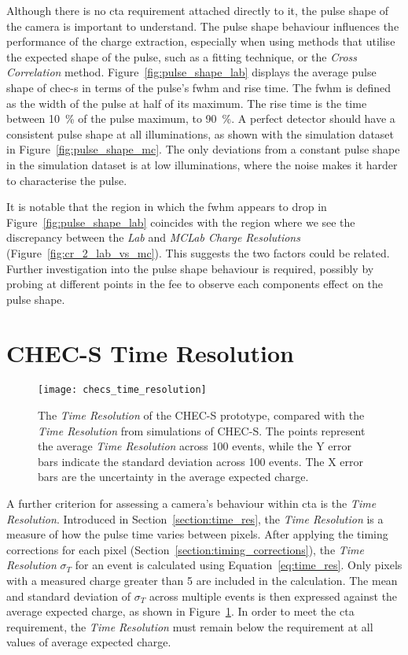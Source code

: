 Although there is no \gls{cta} requirement attached directly to it, the pulse shape of the camera is important to understand. The pulse shape behaviour influences the performance of the charge extraction, especially when using methods that utilise the expected shape of the pulse, such as a fitting technique, or the \textit{Cross Correlation} method. Figure~\ref{fig:pulse_shape_lab} displays the average pulse shape of \gls{chec-s} in terms of the pulse's \gls{fwhm} and rise time. The \gls{fwhm} is defined as the width of the pulse at half of its maximum. The rise time is the time between \SI{10}{\percent} of the pulse maximum, to \SI{90}{\percent}. A perfect detector should have a consistent pulse shape at all illuminations, as shown with the simulation dataset in Figure~\ref{fig:pulse_shape_mc}. The only deviations from a constant pulse shape in the simulation dataset is at low illuminations, where the noise makes it harder to characterise the pulse. 

It is notable that the region in which the \gls{fwhm} appears to drop in Figure~\ref{fig:pulse_shape_lab} coincides with the region where we see the discrepancy between the \textit{Lab} and \textit{MCLab Charge Resolutions} (Figure~\ref{fig:cr_2_lab_vs_mc}). This suggests the two factors could be related. Further investigation into the pulse shape behaviour is required, possibly by probing at different points in the \gls{fee} to observe each components effect on the pulse shape. 

\section{CHEC-S Time Resolution}

\begin{figure}
	\centering
    \texttt{[image: checs\_time\_resolution]} 
	\caption[CHEC-S \textit{Time Resolution}.]{The \textit{Time Resolution} of the CHEC-S prototype, compared with the \textit{Time Resolution} from simulations of CHEC-S. The points represent the average \textit{Time Resolution} across 100 events, while the Y error bars indicate the standard deviation across 100 events. The X error bars are the uncertainty in the average expected charge.}
	\label{fig:checs_time_resolution}
\end{figure}

A further criterion for assessing a camera's behaviour within \gls{cta} is the \textit{Time Resolution}. Introduced in Section~\ref{section:time_res}, the \textit{Time Resolution} is a measure of how the pulse time varies between pixels. After applying the timing corrections for each pixel (Section~\ref{section:timing_corrections}), the \textit{Time Resolution} $\sigma_T$ for an event is calculated using Equation~\ref{eq:time_res}. Only pixels with a measured charge greater than \SI{5}{\pe} are included in the calculation. The mean and standard deviation of $\sigma_T$ across multiple events is then expressed against the average expected charge, as shown in Figure~\ref{fig:checs_time_resolution}. In order to meet the \gls{cta} requirement, the \textit{Time Resolution} must remain below the requirement at all values of average expected charge.

